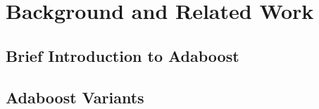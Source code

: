 \section{Background and Related Work}

\subsection{Brief Introduction to Adaboost}

\subsection{Adaboost Variants}